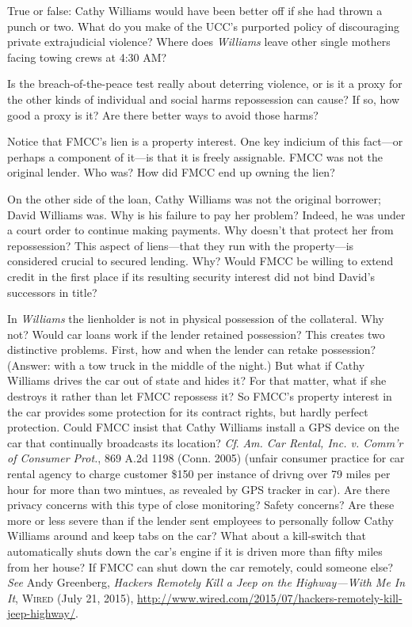
\item True or false: Cathy Williams would have been better off if she had thrown
a punch or two. What do you make of the UCC's purported policy of discouraging
private extrajudicial violence? Where does \textit{Williams} leave other single
mothers facing towing crews at 4:30 AM?


\item Is the breach-of-the-peace test really about deterring violence, or is it
a proxy for the other kinds of individual and social harms repossession can
cause? If so, how good a proxy is it? Are there better ways to avoid those
harms?


\item Notice that FMCC's lien is a property interest. One key indicium of this
fact---or perhaps a component of it---is that it is freely assignable. FMCC
was not the original lender. Who was? How did FMCC end up owning the lien? 


\item On the other side of the loan, Cathy Williams was not the original
borrower; David Williams was. Why is his failure to pay her problem? Indeed, he
was under a court order to continue making payments. Why doesn't that protect
her from repossession? This aspect of liens---that they run with the
property---is considered crucial to secured lending. Why? Would FMCC be willing
to
extend credit in the first place if its resulting security interest did not
bind David's successors in title?


\item In \textit{Williams} the lienholder is not in physical possession of the
collateral. Why not? Would car loans work if the lender retained possession?
This creates two distinctive problems. First, how and when the lender can
retake possession? (Answer: with a tow truck in the middle of the night.) But
what if Cathy Williams drives the car out of state and hides it? For that
matter, what if she destroys it rather than let FMCC repossess it? So FMCC's
property interest in the car provides some protection for its contract rights,
but hardly perfect protection. Could FMCC insist that Cathy Williams install a
GPS device on the car that continually broadcasts its location? \textit{Cf}.
\emph{Am. Car Rental, Inc. v. Comm'r of Consumer Prot.}, 869 A.2d 1198
(Conn. 2005) (unfair consumer practice for car rental agency to charge customer
\$150 per instance of drivng over 79 miles per hour for more than two mintues,
as revealed by GPS tracker in car). Are there privacy concerns with this type
of close monitoring? Safety concerns? Are these more or less severe than if the
lender sent employees to personally follow Cathy Williams around and keep tabs
on the car? What about a kill-switch that automatically shuts down the car's
engine if it is driven more than fifty miles from her house? If FMCC can shut
down the car remotely, could someone else? \textit{See} Andy Greenberg,
\textit{Hackers Remotely Kill a Jeep on the Highway---With Me In It},
\textsc{Wired} (July 21, 2015),
\url{http://www.wired.com/2015/07/hackers-remotely-kill-jeep-highway/}.


